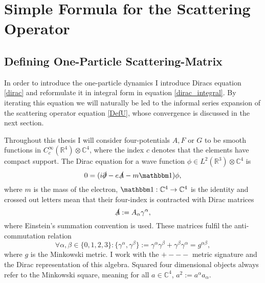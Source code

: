 \documentclass[b5paper,draft,openbib,12pt]{memoir}
\newcommand{\id}{{\mathbbm 1}}
\begin{document}
\section{Simple Formula for the Scattering Operator}

\subsection{Defining One-Particle Scattering-Matrix}\label{sec:one-particle}


In order to introduce the one-particle dynamics I introduce Diracs equation \eqref{dirac} and reformulate it in integral form in equation \eqref{dirac_integral}. By iterating this equation we will naturally be led to the informal series expansion of the scattering operator equation \eqref{DefU}, whose convergence is discussed in the next section. 

Throughout this thesis I will consider four-potentials $A, F$ or \(G\) to be smooth functions
in \(C_{c}^\infty(\mathbb{R}^4)\otimes \mathbb{C}^4\), where the index \(c\)
denotes that the elements have compact support. The Dirac
equation for a wave function \(\phi \in L^2(\mathbb{R}^3)\otimes \mathbb{C}^4\)
is
\begin{equation}\label{dirac}
0= (i\slashed{\partial}-e\slashed{A}-m \id) \phi,
\end{equation}
where \(m\) is the mass of the electron, \(\id: \mathbb{C}^4\rightarrow \mathbb{C}^4\) is the identity  and crossed out letters mean that their four-index is contracted with Dirac matrices
\begin{equation}
\slashed{A}:= A_\alpha \gamma^\alpha,
\end{equation}
where Einstein's summation convention is used. These matrices fulfil the anti-commutation relation
\begin{equation}
\forall \alpha, \beta \in \{0,1,2,3\}:\{\gamma^\alpha, \gamma^\beta\}:= \gamma^\alpha \gamma^\beta+ \gamma^\beta \gamma^\alpha= g^{\alpha \beta},
\end{equation}
where \(g\) is the Minkowski metric. I work with the \(+---\) metric signature and the Dirac representation of this algebra. Squared four dimensional objects always refer to the Minkowski square, meaning for all \(a\in \mathbb{C}^4\), \(a^2:= a^{\alpha} a_{\alpha}\). 
\end{document}
